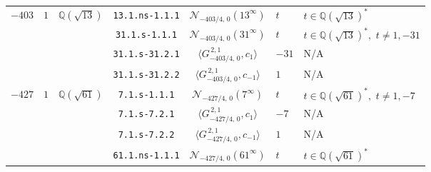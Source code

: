 \documentclass[11pt]{amsart}
\newtheorem{proposition}[defn]{Proposition}
\theoremstyle{definition}
\newcommand{\Q}{\mathbb Q}
\begin{document}
{\begin{longtable}{|c|c|c|c|c|l|l|}
{$-403$} &  {$1$} &  {$\Q(\sqrt{13})$} 
 & \texttt{13.1.ns-1.1.1} & $\mathcal{N}_{-403/4,\,0}(13^{\infty})$ &   $t$ &  $t\in \Q(\sqrt{13})^*$ \\ \cline{4-7} 
&  & & \texttt{31.1.s-1.1.1} & $\mathcal{N}_{-403/4,\,0}(31^{\infty})$ &   $t$ &  $t\in \Q(\sqrt{13})^*,\,\,t\ne 1,-31 $ \\ \cline{4-7} 
& &  & \texttt{31.1.s-31.2.1} & $\langle G^{\,2,1}_{-403/4,\,0},c_{1}\rangle$ &   $-31$ &  N/A \\ \cline{4-7} 
& &  & \texttt{31.1.s-31.2.2} & $\langle G^{\, 2,1}_{-403/4,\,0},c_{-1}\rangle$ &   $1$ &  N/A \\ \hline
{$-427$} & {$1$} &  {$\Q(\sqrt{61})$} 
 & \texttt{7.1.s-1.1.1} & $\mathcal{N}_{-427/4,\,0}(7^{\infty})$ &   $t$ &  $t\in \Q(\sqrt{61})^*,\,\,t\ne 1,-7 $ \\ \cline{4-7} 
& &  & \texttt{7.1.s-7.2.1} & $\langle G^{\,2,1}_{-427/4,\,0},c_{1}\rangle$ &   $-7$ &  N/A \\ \cline{4-7} 
& &  & \texttt{7.1.s-7.2.2} & $\langle G^{\, 2,1}_{-427/4,\,0},c_{-1}\rangle$ &   $1$ &  N/A \\ \cline{4-7} 
&  & & \texttt{61.1.ns-1.1.1} & $\mathcal{N}_{-427/4,\,0}(61^{\infty})$ &   $t$ &  $t\in \Q(\sqrt{61})^*$ \\ \hline

\end{longtable}
}








\end{document}
